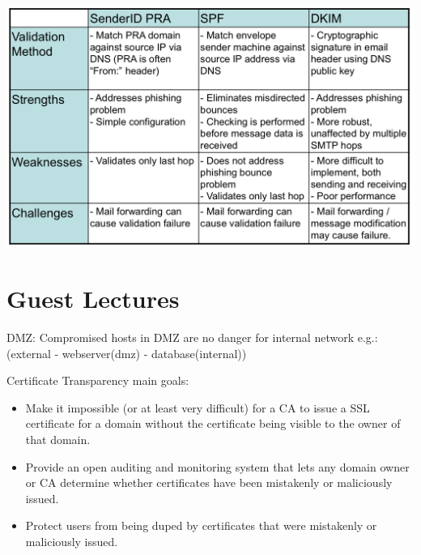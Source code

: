 \documentclass[fs, footer]{latex4ei}
\begin{document}
\begin{multicols*}{4}
{	\includegraphics[width=\columnwidth]{img/emailauth.png}

	}
\section{Guest Lectures}
DMZ: Compromised hosts in DMZ are no danger for internal network e.g.:(external - webserver(dmz) - database(internal))

Certificate Transparency  main goals:
\begin{itemize}
	\item Make it impossible (or at least very difficult) for a CA to issue a SSL certificate for a domain without the certificate being visible to the owner of that domain.
	\item Provide an open auditing and monitoring system that lets any domain owner or CA determine whether certificates have been mistakenly or maliciously issued.
	\item Protect users from being duped by certificates that were mistakenly or maliciously issued.
\end{itemize}

\end{multicols*}

\end{document}
